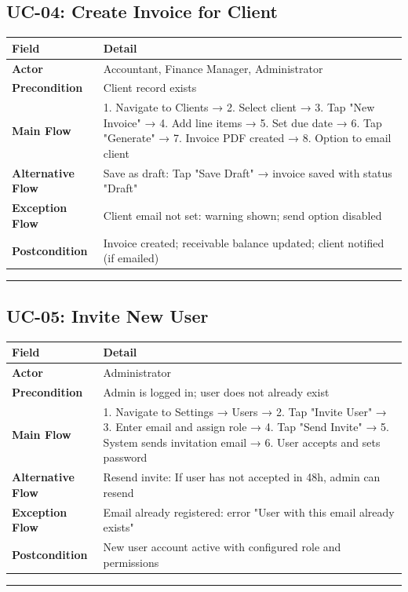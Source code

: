 \documentclass[journal, a4paper, onecolumn, 12pt]{IEEEtran}
\begin{document}
\subsection{UC-04: Create Invoice for Client}

\begin{longtable}{|p{}|p{}|}
\hline
Field & Detail \\ \hline
\hline
\textbf{Actor} & Accountant, Finance Manager, Administrator \\ \hline
\textbf{Precondition} & Client record exists \\ \hline
\textbf{Main Flow} & 1. Navigate to Clients → 2. Select client → 3. Tap "New Invoice" → 4. Add line items → 5. Set due date → 6. Tap "Generate" → 7. Invoice PDF created → 8. Option to email client \\ \hline
\textbf{Alternative Flow} & Save as draft: Tap "Save Draft" → invoice saved with status "Draft" \\ \hline
\textbf{Exception Flow} & Client email not set: warning shown; send option disabled \\ \hline
\textbf{Postcondition} & Invoice created; receivable balance updated; client notified (if emailed) \\ \hline
\end{longtable}
\vspace{1em}\hrule\vspace{1em}

\subsection{UC-05: Invite New User}

\begin{longtable}{|p{}|p{}|}
\hline
Field & Detail \\ \hline
\hline
\textbf{Actor} & Administrator \\ \hline
\textbf{Precondition} & Admin is logged in; user does not already exist \\ \hline
\textbf{Main Flow} & 1. Navigate to Settings → Users → 2. Tap "Invite User" → 3. Enter email and assign role → 4. Tap "Send Invite" → 5. System sends invitation email → 6. User accepts and sets password \\ \hline
\textbf{Alternative Flow} & Resend invite: If user has not accepted in 48h, admin can resend \\ \hline
\textbf{Exception Flow} & Email already registered: error "User with this email already exists" \\ \hline
\textbf{Postcondition} & New user account active with configured role and permissions \\ \hline
\end{longtable}
\vspace{1em}\hrule\vspace{1em}
\end{document}
